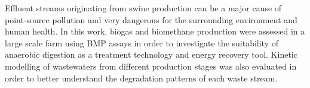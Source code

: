 Effluent streams originating from swine production can be a major cause of point-source pollution and very dangerous for the surrounding environment and human health. In this work,  biogas and biomethane production were assessed in a large scale farm using BMP assays in order to investigate the suitability of anaerobic digestion as a treatment technology and energy recovery tool. Kinetic modelling of wastewaters from different production stages was also evaluated in order to better understand the degradation patterns of each waste stream.